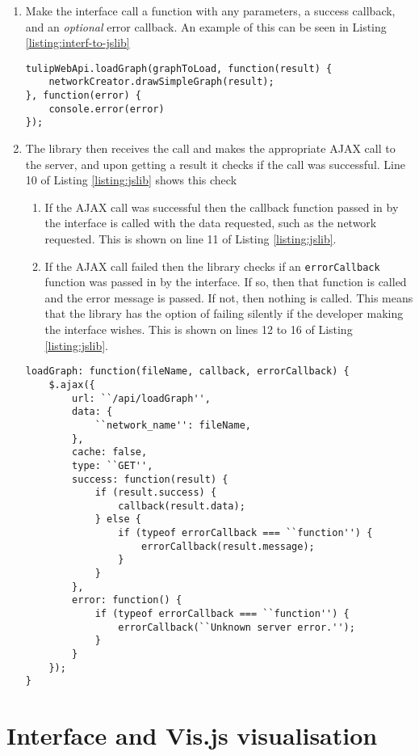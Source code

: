 \documentclass[../dissertation.tex]{subfiles}
\begin{document}
\begin{enumerate}
    \item Make the interface call a function with any parameters, a success callback, and an \emph{optional} error callback. An example of this can be seen in Listing \ref{listing:interf-to-jslib}
    \begin{lstlisting}[caption=How the interface would call the JavaScript library, label=listing:interf-to-jslib]
tulipWebApi.loadGraph(graphToLoad, function(result) {
	networkCreator.drawSimpleGraph(result);
}, function(error) {
	console.error(error)
});
    \end{lstlisting}
    \item The library then receives the call and makes the appropriate AJAX call to the server, and upon getting a result it checks if the call was successful. Line 10 of Listing \ref{listing:jslib} shows this check
    \begin{enumerate}
        \item If the AJAX call was successful then the callback function passed in by the interface is called with the data requested, such as the network requested. This is shown on line 11 of Listing \ref{listing:jslib}.
        \item If the AJAX call failed then the library checks if an \texttt{errorCallback} function was passed in by the interface. If so, then that function is called and the error message is passed. If not, then nothing is called. This means that the library has the option of failing silently if the developer making the interface wishes. This is shown on lines 12 to 16 of Listing \ref{listing:jslib}.
    \end{enumerate}
    \begin{lstlisting}[caption=How the JavaScript library catches and passes errors, label=listing:jslib]
loadGraph: function(fileName, callback, errorCallback) {
	$.ajax({
		url: ``/api/loadGraph'',
		data: {
	        ``network_name'': fileName,
	    },
	    cache: false,
	    type: ``GET'',
		success: function(result) {
			if (result.success) {
        		callback(result.data);
			} else {
				if (typeof errorCallback === ``function'') {
					errorCallback(result.message);
				}
			}
        },
		error: function() {
			if (typeof errorCallback === ``function'') {
				errorCallback(``Unknown server error.'');
			}
        }
    });
}
\end{lstlisting}
\end{enumerate}

\section{Interface and Vis.js visualisation}
\end{document}
